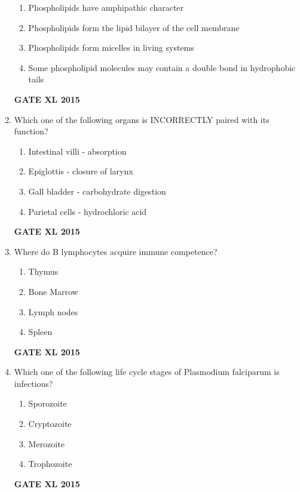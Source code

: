 \documentclass[journal,12pt,onecolumn]{IEEEtran}
\begin{document}
\begin{enumerate}
    \begin{enumerate}
            \item  Phospholipids have amphipathic character
	    \item  Phospholipids form the lipid bilayer of the cell membrane
	    \item Phospholipids form micelles in living systems
            \item Some phospholipid molecules may contain a double bond in hydrophobic tails
    \end{enumerate}
\begin{flushright}\textbf{GATE XL 2015}\end{flushright}
\item Which one of the following organs is INCORRECTLY paired with its function?
    \begin{enumerate}
            \item  Intestinal villi - absorption
	    \item Epiglottis - closure of larynx
	    \item Gall bladder - carbohydrate digestion
            \item Parietal cells - hydrochloric acid
    \end{enumerate}
\begin{flushright}\textbf{GATE XL 2015}\end{flushright}
\item Where do B lymphocytes acquire immune competence?
    \begin{enumerate}
            \item Thymus 
	    \item Bone Marrow
	    \item Lymph nodes
            \item Spleen
    \end{enumerate}
\begin{flushright}\textbf{GATE XL 2015}\end{flushright}
\item Which one of the following life cycle stages of Plasmodium falciparum is infectious?
    \begin{enumerate}
            \item Sporozoite
	    \item Cryptozoite
	    \item Merozoite
            \item Trophozoite
    \end{enumerate}
\begin{flushright}\textbf{GATE XL 2015}\end{flushright}

\end{enumerate}
\end{document}
